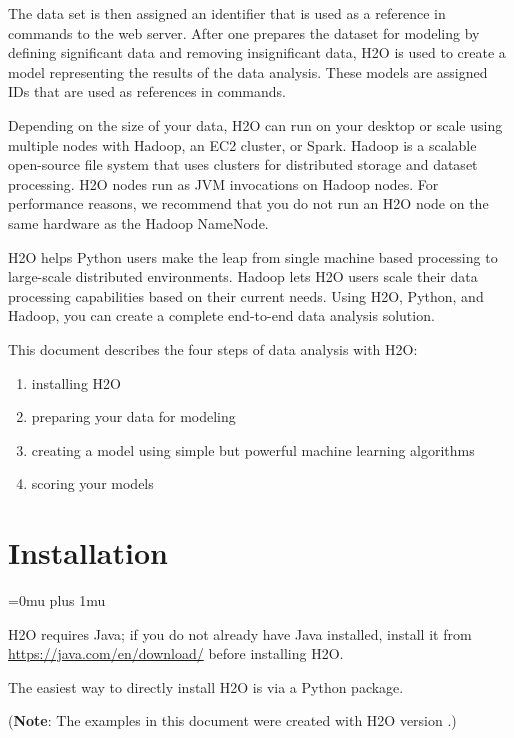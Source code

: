 The data set is then assigned an identifier that is used as a reference in  commands to the web server.
After one prepares the dataset for modeling by defining significant data and removing insignificant data,
H2O is used to create a model representing the results of the data analysis.
These models are assigned IDs that are used as references in commands.

Depending on the size of your data,  H2O can run on your desktop or scale using multiple nodes with Hadoop,
an EC2 cluster, or Spark.  Hadoop is a scalable open-source file
system that uses clusters for distributed storage and dataset processing. H2O nodes run as JVM invocations on Hadoop
nodes. For performance reasons, we recommend that you do not run an H2O node on the same hardware as the Hadoop
NameNode.

H2O helps Python users make the leap from single machine based processing to large-scale distributed environments.
Hadoop lets H2O users scale their data processing capabilities based on their current needs.
Using H2O, Python, and Hadoop, you can create a complete end-to-end data analysis solution.

This document describes the four steps of data analysis with H2O:
\begin{enumerate}

\item installing H2O
\item preparing your data for modeling
\item creating a model using simple but powerful machine learning algorithms
\item scoring your models

\end{enumerate}




\section{Installation} 
\Urlmuskip=0mu plus 1mu\relax %

H2O requires Java; if you do not already have Java installed, install it from {\url{https://java.com/en/download/}} before installing H2O. 

The easiest way to directly install H2O is  via a Python package.

({\bf{Note}}: The examples in this document were created with H2O version \waterVersion.)

